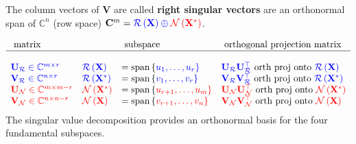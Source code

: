 \documentclass[14pt]{article}
\theoremstyle{definition}
\theoremstyle{remark}
\begin{document}
The column vectors of $\mathbf{V}$ are called \textbf{right singular vectors}
are an orthonormal span of $\mathbb{C}^n$ (row space) $ \mathbf{C}^{m} =
    \color{blue}{\mathcal{R} \left( \mathbf{X} \right)} \oplus
    \color{red} {\mathcal{N} \left( \mathbf{X}^{*} \right)}$.

$$
    \begin{array}{llll}
        \text{ matrix }   &                                                       & \text{ subspace }  & \text{ orthogonal projection matrix } \\
        \hline\\
        \color{blue}{\mathbf{U}_{\mathcal{R}}}\in\mathbb{C}^{m\times r}  &
        \color{blue}{\mathcal{R}\left(\mathbf{X}\right)}                 & =
        \text{span}\left\{\color{blue}{u_{1}},\dots,\color{blue}{u_{r}}\right\}
        &  {\color{blue}\mathbf{U}_{\mathcal{R}}} {\color{blue}\mathbf{U}_{\mathcal{R}}^\top}  \text{ orth proj onto }  {\color{blue}\mathcal{R}\left(\mathbf{X}\right)}  \\
        \color{blue}{\mathbf{V}_{\mathcal{R}}}\in\mathbb{C}^{n\times r}  &
        \color{blue}{\mathcal{R}\left(\mathbf{X}^{*}\right)}             & =
        \text{span}\left\{\color{blue}{v_{1}},\dots,\color{blue}{v_{r}}\right\}   
        &  {\color{blue}\mathbf{V}_{\mathcal{R}}} {\color{blue}\mathbf{V}_{\mathcal{R}}^\top}  \text{ orth proj onto }  {\color{blue}\mathcal{R}\left(\mathbf{X}^*\right)}  \\
        \color{red}{\mathbf{U}_{\mathcal{N}}}\in\mathbb{C}^{m\times m-r} &
        \color{red}{\mathcal{N}\left(\mathbf{X^{*}}\right)}              & =
        \text{span}\left\{\color{red}{u_{r+1}},\dots,\color{red}{u_{m}}\right\} 
        &  {\color{red}\mathbf{U}_{\mathcal{N}}} {\color{red}\mathbf{U}_{\mathcal{N}}^\top}  \text{ orth proj onto }  {\color{red}\mathcal{N}\left(\mathbf{X^{*}}\right)}     \\
        \color{red}{\mathbf{V}_{\mathcal{N}}}\in\mathbb{C}^{n\times n-r} &
        \color{red}{\mathcal{N}\left(\mathbf{X}\right)}                  & =
        \text{span}\left\{\color{red}{v_{r+1}},\dots,\color{red}{v_{n}}\right\}  
        &  {\color{red}\mathbf{V}_{\mathcal{N}}}{\color{red}\mathbf{V}_{\mathcal{N}}^\top}  \text{ orth proj onto }  {\color{red}\mathcal{N}\left(\mathbf{X}\right)}   \\
    \end{array}
$$
The singular value decomposition provides an orthonormal basis for the four fundamental subspaces.
\end{document}
